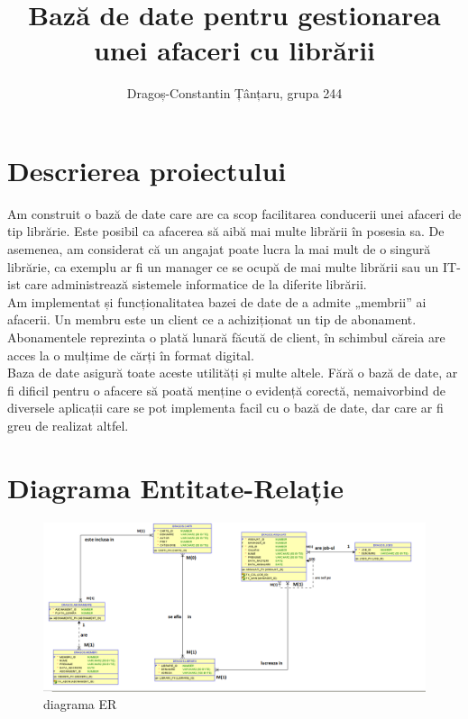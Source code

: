 \documentclass[12pt]{article}
\title{Bază de date pentru gestionarea unei afaceri cu librării}
\author{Dragoș-Constantin Țânțaru, grupa 244}
\begin{document}
\maketitle
\thispagestyle{fancy} 
\section{Descrierea proiectului}
Am construit o bază de date care are ca scop facilitarea conducerii unei afaceri de tip librărie. Este posibil ca afacerea să aibă mai multe librării în posesia sa. De asemenea, am considerat că un angajat poate lucra la mai mult de o singură librărie, ca exemplu ar fi un manager ce se ocupă de mai multe librării sau un IT-ist care administrează sistemele informatice de la diferite librării.\\
Am implementat și funcționalitatea bazei de date de a admite „membrii” ai afacerii. Un membru este un client ce a achiziționat un tip de abonament. Abonamentele reprezinta o plată lunară făcută de client, în schimbul căreia are acces la o mulțime de cărți în format digital.\\
Baza de date asigură toate aceste utilități și multe altele. Fără o bază de date, ar fi dificil pentru o afacere să poată menține o evidență corectă, nemaivorbind de diversele aplicații care se pot implementa facil cu o bază de date, dar care ar fi greu de realizat altfel.
\section{Diagrama Entitate-Relație}
\begin{figure}[!htb]
	\includegraphics[max width=\linewidth]{imgs/diagER.png}
	\caption{diagrama ER}
	\label{fig:ER}
\end{figure}
\end{document}
